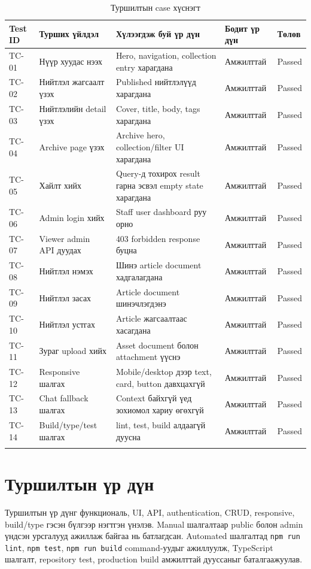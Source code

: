 {\small
\begin{longtable}{|L{0.06\textwidth}|L{0.20\textwidth}|L{0.26\textwidth}|L{0.16\textwidth}|L{0.10\textwidth}|}
  \hline
  \textbf{Test ID} & \textbf{Турших үйлдэл} & \textbf{Хүлээгдэж буй үр дүн} & \textbf{Бодит үр дүн} & \textbf{Төлөв} \\ \hline
  TC-01 & Нүүр хуудас нээх & Hero, navigation, collection entry харагдана & Амжилттай & Passed \\ \hline
  TC-02 & Нийтлэл жагсаалт үзэх & Published нийтлэлүүд харагдана & Амжилттай & Passed \\ \hline
  TC-03 & Нийтлэлийн detail үзэх & Cover, title, body, tags харагдана & Амжилттай & Passed \\ \hline
  TC-04 & Archive page үзэх & Archive hero, collection/filter UI харагдана & Амжилттай & Passed \\ \hline
  TC-05 & Хайлт хийх & Query-д тохирох result гарна эсвэл empty state харагдана & Амжилттай & Passed \\ \hline
  TC-06 & Admin login хийх & Staff user dashboard руу орно & Амжилттай & Passed \\ \hline
  TC-07 & Viewer admin API дуудах & 403 forbidden response буцна & Амжилттай & Passed \\ \hline
  TC-08 & Нийтлэл нэмэх & Шинэ article document хадгалагдана & Амжилттай & Passed \\ \hline
  TC-09 & Нийтлэл засах & Article document шинэчлэгдэнэ & Амжилттай & Passed \\ \hline
  TC-10 & Нийтлэл устгах & Article жагсаалтаас хасагдана & Амжилттай & Passed \\ \hline
  TC-11 & Зураг upload хийх & Asset document болон attachment үүснэ & Амжилттай & Passed \\ \hline
  TC-12 & Responsive шалгах & Mobile/desktop дээр text, card, button давхцахгүй & Амжилттай & Passed \\ \hline
  TC-13 & Chat fallback шалгах & Context байхгүй үед зохиомол хариу өгөхгүй & Амжилттай & Passed \\ \hline
  TC-14 & Build/type/test шалгах & lint, test, build алдаагүй дуусна & Амжилттай & Passed \\ \hline
  \caption{Туршилтын case хүснэгт}
  \label{tab:ch4-test-cases}\\
\end{longtable}
}

\section{Туршилтын үр дүн}
Туршилтын үр дүнг функциональ, UI, API, authentication, CRUD, responsive, build/type гэсэн бүлгээр нэгтгэн үнэлэв. Manual шалгалтаар public болон admin үндсэн урсгалууд ажиллаж байгаа нь батлагдсан. Automated шалгалтад \texttt{npm run lint}, \texttt{npm test}, \texttt{npm run build} command-уудыг ажиллуулж, TypeScript шалгалт, repository test, production build амжилттай дууссаныг баталгаажуулав.

